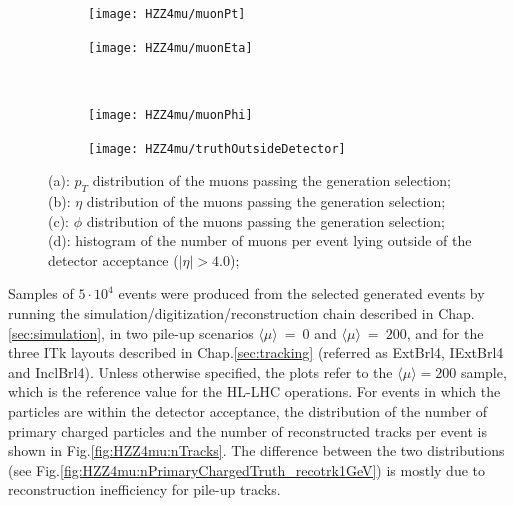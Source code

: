 \documentclass[a4paper,twoside,12pt]{book}
\begin{document}
\begin{figure}
\begin{subfigure}{.5\linewidth}
\texttt{[image: HZZ4mu/muonPt]}
\caption{}
\label{fig:HZZ4mu:pt}
\end{subfigure}
\begin{subfigure}{.5\linewidth}
\centering
\texttt{[image: HZZ4mu/muonEta]}
\caption{}
\label{fig:HZZ4mu:eta}
\end{subfigure}\\[1 ex]
\begin{subfigure}{.5\linewidth}
\centering
\texttt{[image: HZZ4mu/muonPhi]}
\caption{}
\label{fig:HZZ4mu:phi}
\end{subfigure}
\begin{subfigure}{.5\linewidth}
\centering
\texttt{[image: HZZ4mu/truthOutsideDetector]}
\caption{}
\label{fig:HZZ4mu:truthOutsideDetector}
\end{subfigure}
\caption{(a): $p_T$ distribution of the muons passing the generation selection;\\
	        (b): $\eta$ distribution of the muons passing the generation selection;\\
        	        (c): $\phi$ distribution of the muons passing the generation selection;\\
         	        (d): histogram of the number of muons per event lying outside of the detector acceptance
         	        	($|\eta| > 4.0$);\\
        	        }
\label{fig:HZZ4mu:muonKinematics}
\end{figure}

Samples of $5 \cdot 10^4$ events were produced from the selected generated events by running
the simulation/digitization/reconstruction chain described in \mbox{Chap.\ref{sec:simulation}}, in
two pile-up scenarios  $\langle\mu\rangle\ =\ 0$ and $\langle\mu\rangle\ =\ 200$, and for the three ITk layouts described in Chap.\ref{sec:tracking} 
(referred as ExtBrl4, IExtBrl4 and InclBrl4). Unless otherwise specified, the plots refer to the $\langle\mu\rangle = 200$ sample, which is the reference
value for the HL-LHC operations. For events in which the particles are within the detector acceptance, the distribution of
the number of primary charged particles and the number of reconstructed tracks per event is shown in
Fig.\ref{fig:HZZ4mu:nTracks}. The difference between the two distributions (see \mbox{Fig.\ref{fig:HZZ4mu:nPrimaryChargedTruth_recotrk1GeV}}) is
mostly due to reconstruction inefficiency for pile-up tracks.
\end{document}

